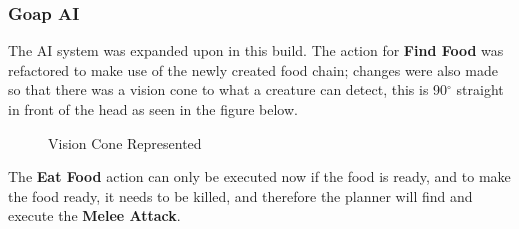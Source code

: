 \documentclass[11pt]{report}
\begin{document}
\subsubsection{Goap AI}
The AI system was expanded upon in this build. The action for \textbf{Find Food} was refactored to make use of the newly created food chain; changes were also made so that there was a vision cone to what a creature can detect, this is 90$^{\circ}$ straight in front of the head as seen in the figure below.
\begin{figure}[H]
    \centering
    \caption{Vision Cone Represented}
\end{figure}

The \textbf{Eat Food} action can only be executed now if the food is ready, and to make the food ready, it needs to be killed, and therefore the planner will find and execute the \textbf{Melee Attack}.
\end{document}
